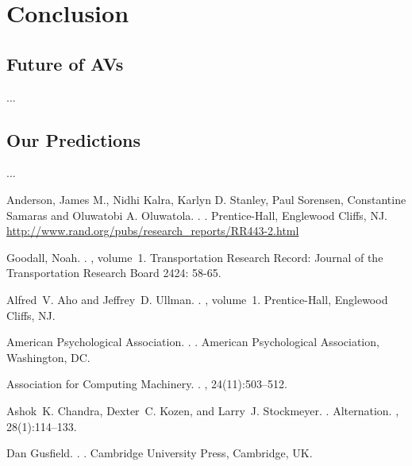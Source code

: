 \documentclass[11pt]{article}
\begin{document}
\section{Conclusion}
\subsection{Future of AVs}
...
\subsection{Our Predictions}
...


%
%

\begin{thebibliography}{}

Anderson, James M., Nidhi Kalra, Karlyn D. Stanley, Paul Sorensen, Constantine Samaras and Oluwatobi A. Oluwatola.
.
.
\newblock Prentice-{Hall}, Englewood Cliffs, NJ.
\newblock \href{http://www.rand.org/pubs/research\_reports/RR443-2.html}{http://www.rand.org/pubs/research\_reports/RR443-2.html}

Goodall, Noah.
.
, volume~1. 
\newblock Transportation Research Record: Journal of the Transportation Research Board 2424: 58-65.



Alfred~V. Aho and Jeffrey~D. Ullman.
.
, volume~1.
\newblock Prentice-{Hall}, Englewood Cliffs, NJ.

{American Psychological Association}.
.
.
\newblock American Psychological Association, Washington, DC.

{Association for Computing Machinery}.
.
, 24(11):503--512.

Ashok~K. Chandra, Dexter~C. Kozen, and Larry~J. Stockmeyer.
.
\newblock Alternation.
,
  28(1):114--133.

Dan Gusfield.
.
.
\newblock Cambridge University Press, Cambridge, UK.

\end{thebibliography}
\end{document}
